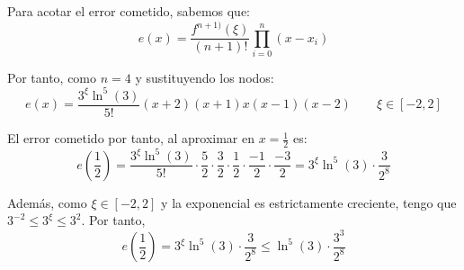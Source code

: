 \begin{ejercicio}
    Para acotar el error cometido, sabemos que:
    \begin{equation*}
        e(x) = \frac{f^{n+1)}(\xi)}{(n+1)!}\prod_{i=0}^n (x-x_i)
    \end{equation*}

    Por tanto, como $n=4$ y sustituyendo los nodos:
    \begin{equation*}
        e(x) = \frac{3^\xi \ln^{5}(3)}{5!} (x+2)(x+1)x(x-1)(x-2) \qquad \xi \in [-2,2]
    \end{equation*}

    El error cometido por tanto, al aproximar en $x=\frac{1}{2}$ es:
    \begin{equation*}
        e\left(\frac{1}{2}\right)
        =\frac{3^\xi \ln^5 (3)}{5!} \cdot \frac{5}{2} \cdot \frac{3}{2} \cdot \frac{1}{2} \cdot \frac{-1}{2} \cdot \frac{-3}{2}
        = 3^\xi \ln^5 (3) \cdot \frac{3}{2^8} 
    \end{equation*}

    Además, como $\xi \in [-2, 2]$ y la exponencial es estrictamente creciente, tengo que $3^{-2} \leq 3^\xi \leq 3^2$. Por tanto,
    \begin{equation*}
        e\left(\frac{1}{2}\right)= 3^\xi \ln^5 (3) \cdot \frac{3}{2^8} \leq \ln^5 (3) \cdot \frac{3^3}{2^8} 
    \end{equation*}
\end{ejercicio}

